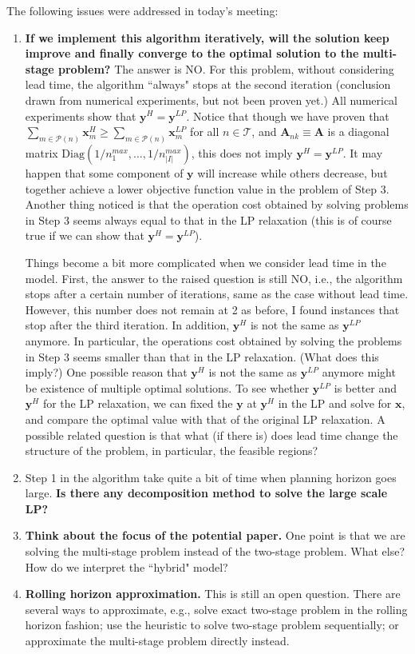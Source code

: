 \documentclass[10pt]{article}
\theoremstyle{plain}
\theoremstyle{definition}
\theoremstyle{remark}
\newcommand{\bA}{\mathbf{A}}
\newcommand{\bx}{\mathbf{x}}
\newcommand{\by}{\mathbf{y}}
\newcommand{\cP}{\mathcal{P}}
\newcommand{\T}{\mathcal{T}}
\begin{document}
The following issues were addressed in today's meeting:
\begin{enumerate}[label=\emph{\alph*})]
\item {\bf If we implement this algorithm iteratively, will the solution keep improve and finally converge to the
optimal solution to the multi-stage problem?}
The answer is NO. For this problem, without considering lead time,
the algorithm ``always" stops at the second iteration (conclusion drawn
from numerical experiments, but not been proven yet.)
All numerical experiments show that $\by^H = \by^{LP}$.
Notice that though we have proven that $\sum_{m\in \cP(n)}{\bx^H_m} \ge  \sum_{m\in \cP(n)}{\bx^{LP}_m}$
for all $n\in \T$, and $\bA_{nk} \equiv \bA$ is a diagonal matrix $\text{Diag}(1/n_1^{max}, \dots, 1/n_{|I|}^{max})$,
this does not imply $\by^H = \by^{LP}$. It may happen that some component of $\by$ will increase
while others decrease, but together achieve a lower objective function value in the problem of Step 3.
Another thing noticed is that the operation cost obtained by solving problems in Step 3 seems always
equal to that in the LP relaxation (this is of course true if we can show that $\by^H = \by^{LP}$).

Things become a bit more complicated when we consider lead time in the model.
First, the answer to the raised question is still NO, i.e., the algorithm stops after
a certain number of iterations, same as the case without lead time. However, 
this number does not remain at 2 as before, I found instances that stop after the third
iteration. In addition, $\by^H$ is not the same as $\by^{LP}$ anymore. In particular,
the operations cost obtained by solving the problems in Step 3 seems smaller than
that in the LP relaxation. (What does this imply?)
One possible reason that $\by^H$ is not the same as $\by^{LP}$ anymore might be
existence of multiple optimal solutions. To see whether $\by^{LP}$ is better and $\by^H$
for the LP relaxation, we can fixed the $\by$ at $\by^H$ in the LP and solve for $\bx$,
and compare the optimal value with that of the original LP relaxation.
A possible related question is that what (if there is) does lead time change the structure of the problem,
in particular, the feasible regions?

\item Step 1 in the algorithm take quite a bit of time when planning horizon goes large.
{\bf Is there any decomposition method to solve the large scale LP?}

\item {\bf Think about the focus of the potential paper.}
One point is that we are solving the multi-stage problem instead of the two-stage problem.
What else? How do we interpret the ``hybrid" model?

\item {\bf Rolling horizon approximation.} This is still an open question. There are several ways
to approximate, e.g., solve exact two-stage problem in the rolling horizon fashion; 
use the heuristic to solve two-stage problem sequentially;
or approximate the multi-stage problem directly instead.
\end{enumerate}
\end{document}
